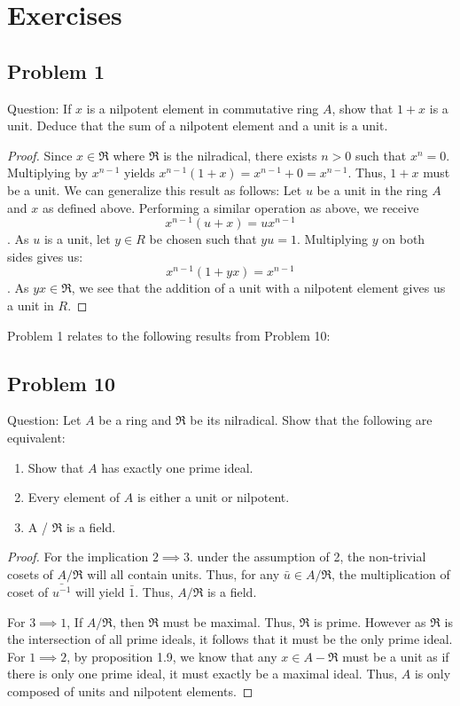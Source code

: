 \documentclass[12pt]{article}
\begin{document}
 \section{Exercises}
 
 \subsection{Problem 1}
 \newpage
 Question: If $x$ is a nilpotent element in commutative ring $A$, show that $1 + x$ is a unit. Deduce that the sum of a nilpotent element and a unit is a unit.
 \begin{proof}
 Since $x \in \mathfrak{R}$ where $\mathfrak{R}$ is the nilradical, there exists $n > 0$ such that $x^n = 0$.
 Multiplying by $x^{n-1}$ yields $x^{n-1}(1 + x) = x^{n-1} + 0 = x^{n-1}$. Thus, $1 + x$ must be a unit. We can generalize this result as follows:
 Let $u$ be a unit in the ring $A$ and $x$ as defined above. Performing a similar operation as above, we receive
  $$ x^{n-1}(u + x) = ux^{n-1} $$. As $u$ is a unit, let $y \in R$ be chosen such that $yu = 1$. Multiplying $y$ on both sides gives us: $$ x^{n-1}(1 + yx) = x^{n-1} $$. As $yx \in \mathfrak{R}$, we see that the addition of a unit with a nilpotent element gives us a unit in $R$.
 \end{proof}

Problem 1 relates to the following results from Problem 10:

\subsection{Problem 10}

Question: Let $A$ be a ring and $\mathfrak{R}$ be its nilradical. Show that the following are equivalent:
\begin{enumerate}
 \item Show that $A$ has exactly one prime ideal.
 \item Every element of $A$ is either a unit or nilpotent.
 \item A / $\mathfrak{R}$ is a field.
\end{enumerate}

\begin{proof}
 For the implication $2 \implies 3$. under the assumption of 2, the non-trivial cosets of $A / \mathfrak{R}$ will all contain units.
 Thus, for any $\bar{u} \in A / \mathfrak{R}$, the multiplication of coset of $\bar{u^{-1}}$ will yield $\bar{1}$. Thus, $A / \mathfrak{R}$ is a field. \par
 For $3 \implies 1$, If $A / \mathfrak{R}$, then $\mathfrak{R}$ must be maximal. Thus, $\mathfrak{R}$ is prime. However as $\mathfrak{R}$ is the intersection of all prime ideals, it follows that it must be the only prime ideal.
 For $1 \implies 2$, by proposition 1.9, we know that any $x \in A - \mathfrak{R}$ must be a unit as if there is only one prime ideal, it must exactly be a maximal ideal. Thus, $A$ is only composed of units and nilpotent elements.
\end{proof}
\end{document}
